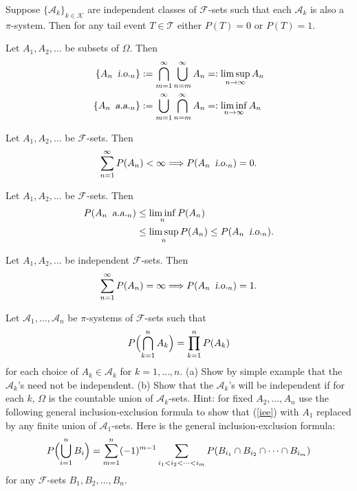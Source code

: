 \begin{theorem}
Suppose $\{\mathscr A_k\}_{k\in\mathcal K}$ are independent classes of  $\mathcal F$-sets such that each $\mathscr A_k$ is also a $\pi$-system. Then for any tail event $T\in\mathcal T$ either $P(T)=0$ or $P(T)=1$.
\end{theorem}

\begin{definition} Let $A_1, A_2, \ldots$ be subsets of $\Omega$. Then
\begin{align*}
\{A_n\, {\,\,\text{\sl i.o.} }_n\} &:= \bigcap_{m=1}^\infty \bigcup_{n=m}^\infty A_n =: \limsup_{n\rightarrow \infty} A_n\\
\{A_n\, {\,\,\text{\sl a.a.} }_n \}&:= \bigcup_{m=1}^\infty \bigcap_{n=m}^\infty A_n =: \liminf_{n\rightarrow \infty} A_n
\end{align*}
\end{definition}

\begin{theorem}
Let $A_1, A_2, \ldots$ be $\mathcal F$-sets. Then
\[ \sum_{n=1}^\infty P(A_n)<\infty \Longrightarrow P(A_n\, {\,\,\text{\sl i.o.} }_n)=0. \]
\end{theorem}

\begin{theorem}
Let $A_1, A_2, \ldots$ be  $\mathcal F$-sets. Then
\begin{align*}
P(A_n\, {\,\,\text{\sl a.a.} }_n)&\leq \liminf_n P(A_n)\\
&\leq \limsup_n P(A_n)\leq P(A_n\, {\,\,\text{\sl i.o.} }_n).
\end{align*}
\end{theorem}

\begin{theorem}
Let $A_1, A_2, \ldots$ be independent $\mathcal F$-sets. Then
\[ \sum_{n=1}^\infty P(A_n)=\infty \Longrightarrow P(A_n\, {\,\,\text{\sl i.o.} }_n)=1. \]
\end{theorem}



\begin{exercise}
Let $\mathscr A_1,\ldots, \mathscr A_n$ be $\pi$-systems of $\mathcal F$-sets such that
\begin{equation}
\label{iee}
 P\Bigl( \bigcap_{k=1}^n A_k \Bigr) = \prod_{k=1}^n P(A_k)
\end{equation}
for each choice of $A_k\in\mathscr A_k$ for $k=1,\ldots, n$. (a) Show by simple example that the $\mathscr A_k$'s need not be independent. (b) Show that the $\mathscr A_k$'s will be independent if for each $k$, $\Omega$ is the countable union of $\mathscr A_k$-sets. Hint: for fixed $A_2,\ldots, A_n$ use the following general inclusion-exclusion formula to show that  (\ref{iee}) with $A_1$ replaced by any finite union of $\mathscr A_1$-sets. Here is the general inclusion-exclusion formula:
\[ P\Bigl( \bigcup_{i=1}^n B_i \Bigr)= \sum_{m=1}^n (-1)^{m-1}\sum_{i_1< i_2<\cdots<i_m} P(B_{i_1}\cap B_{i_2}\cap \cdots \cap B_{i_m}) \]
for any $\mathcal F$-sets $B_1, B_2,\ldots, B_n$.
\end{exercise}


